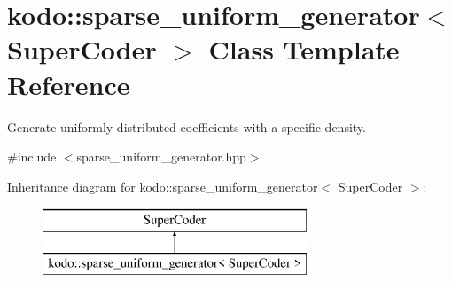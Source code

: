 \hypertarget{classkodo_1_1sparse__uniform__generator}{\section{kodo\-:\-:sparse\-\_\-uniform\-\_\-generator$<$ Super\-Coder $>$ Class Template Reference}
\label{classkodo_1_1sparse__uniform__generator}
}


Generate uniformly distributed coefficients with a specific density.  




{\ttfamily \#include $<$sparse\-\_\-uniform\-\_\-generator.\-hpp$>$}

Inheritance diagram for kodo\-:\-:sparse\-\_\-uniform\-\_\-generator$<$ Super\-Coder $>$\-:\begin{figure}[H]
\begin{center}
\leavevmode
\includegraphics[height=2.000000cm]{classkodo_1_1sparse__uniform__generator}
\end{center}
\end{figure}
